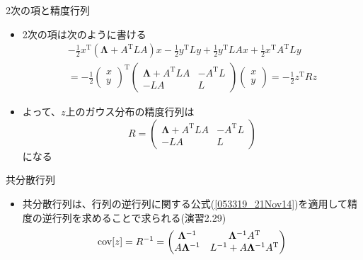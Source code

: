 \begin{frame}{2次の項と精度行列}
 \begin{itemize}
  \item 2次の項は次のように書ける
        \begin{eqnarray}
         -\frac{1}{2}x^{\mathrm{T}}(\bm{\Lambda}+A^{\mathrm{T}}LA)x -\frac{1}{2}y^{\mathrm{T}}Ly+\frac{1}{2}y^{\mathrm{T}}LAx+\frac{1}{2}x^{\mathrm{T}}A^{\mathrm{T}}Ly \nonumber \\
         = -\frac{1}{2}
          \begin{pmatrix}
           x \\
           y
          \end{pmatrix}^{\mathrm{T}}
          \begin{pmatrix}
           \bm{\Lambda}+A^{\mathrm{T}}LA & -A^{\mathrm{T}}L\\
           -LA & L
          \end{pmatrix}
          \begin{pmatrix}
           x \\
           y
          \end{pmatrix}
          = -\frac{1}{2}z^{\mathrm{T}}Rz
        \end{eqnarray}
  \item よって、$z$上のガウス分布の精度行列は
        \begin{equation}
         R=
          \begin{pmatrix}
           \bm{\Lambda}+A^{\mathrm{T}}LA & -A^{\mathrm{T}}L\\
           -LA & L
          \end{pmatrix}
        \end{equation}
        になる
 \end{itemize}
\end{frame}

\begin{frame}{共分散行列}
 \begin{itemize}
  \item 共分散行列は、行列の逆行列に関する公式(\ref{053319_21Nov14})を適用して精度の逆行列を求めることで求られる(演習2.29)
        \begin{equation}
         {\rm cov}[z]=R^{-1}=
          \begin{pmatrix}
           \bm{\Lambda}^{-1} & \bm{\Lambda}^{-1}A^{\mathrm{T}} \\
           A\bm{\Lambda}^{-1} & L^{-1} + A\bm{\Lambda}^{-1}A^{\mathrm{T}}
          \end{pmatrix}\label{054122_21Nov14}
        \end{equation}
 \end{itemize}
\end{frame}

